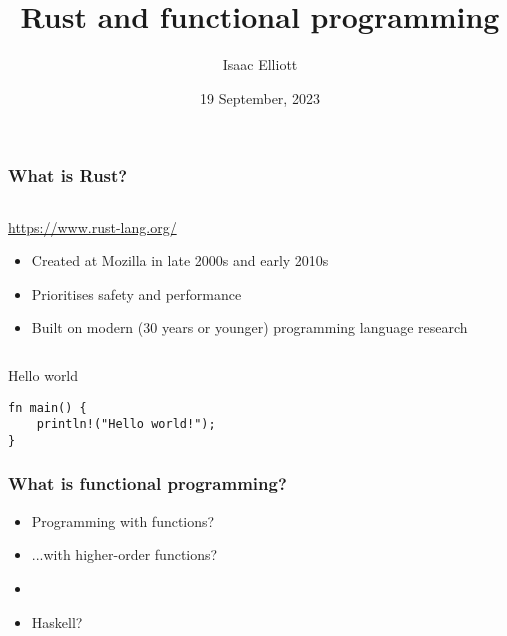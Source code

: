 \documentclass[t]{beamer}
\title{Rust and functional programming}
\author{Isaac Elliott}
\date{19 September, 2023}
\begin{document}
\frame{\titlepage}


\begin{frame}[fragile]
\frametitle{What is Rust?}
\begin{comment}
Test
\end{comment}

\begin{columns}

\begin{column}[T]{0.75\textwidth}

\url{https://www.rust-lang.org/}

\begin{itemize}
\item Created at Mozilla in late 2000s and early 2010s
\item Prioritises safety and performance
\item Built on modern (30 years or younger) programming language research
\end{itemize}

\end{column}

\begin{column}[T]{0.25\textwidth}

\end{column}

\end{columns}

\vfill

\begin{block}{Hello world}
\begin{verbatim}
fn main() {
    println!("Hello world!");
}
\end{verbatim}
\end{block}

\end{frame}


\begin{frame}[c,fragile]
\frametitle{What is functional programming?}
\begin{comment}
I find functional programming a lot harder to define than something like Rust.
\end{comment}

\begin{itemize}
\item Programming with functions?
\item ...with higher-order functions?
\item 
\item Haskell? 
\end{itemize}

\end{frame}
\end{document}
